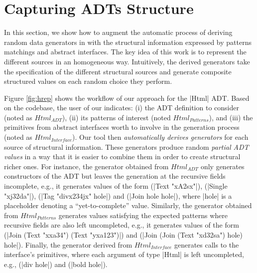 \section{Capturing ADTs Structure} \label{sec:hrepcont}

\begin{figure*}[t]
  \centering
  
  \caption{Deriving a generator for the ADT |Html| with the structural
    information found in module |M|.}
  \vspace{-5pt}
  \label{fig:hrep}
  \vspace{-5pt}
\end{figure*}

In this section, we show how to augment the automatic process of deriving random
data generators in {\dragen} with the structural information expressed by
patterns matchings and abstract interfaces.
%
The key idea of this work is to represent the different sources in an
homogeneous way.
%
Intuitively, the derived generators take the specification of the different
structural sources and generate composite structured values on each random
choice they perform.
%

Figure \ref{fig:hrep} shows the workflow of our approach for the |Html| ADT.
%
Based on the codebase, the user of our \dragenp indicates: (i) the ADT
definition to consider (noted as $Html_{ADT}$), (ii) its patterns of interest
(noted $Html_{Patterns}$), and (iii) the primitives from abstract interfaces
worth to involve in the generation process (noted as $Html_{Interface}$).
%
%
Our tool then \emph{automatically derives generators} for each source of
structural information.
%
These generators produce random \emph{partial ADT values} in a way that it is
easier to combine them in order to create structural richer ones.
%
For instance, the generator obtained from $Html_{ADT}$ only generates
constructors of the ADT but leaves the generation at the recursive fields
incomplete, e.g., it generates values of the form (|Text "xA2sx"|), (|Single
"xj32da"|), (|Tag "divx234jx" hole|) and (|Join hole hole|), where |hole| is a
placeholder denoting a ``yet-to-complete'' value.
%
%
%
Similarly, the generator obtained from $Html_{Patterns}$ generates values
satisfying the expected patterns where recursive fields are also left
uncompleted, e.g., it generates values of the form (|Join (Text "xxa34") (Text
"yxa123")|) and (|Join (Join (Text "xd32sa") hole) hole|).
%
Finally, the generator derived from $Html_{Interface}$ generates calls to the
interface's primitives, where each argument of type |Html| is left uncompleted,
e.g., (|div hole|) and (|bold hole|).
%

